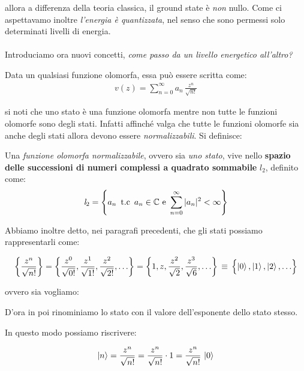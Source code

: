 	allora a differenza della teoria classica, il ground state è \textit{non} nullo. Come ci aspettavamo inoltre \textit{l'energia è quantizzata}, nel senso che sono permessi solo determinati livelli di energia.
	\\
	\\ 
	Introduciamo ora nuovi concetti, \textit{come passo da un livello energetico all'altro?}

\begin{mydef}
	Data un qualsiasi funzione olomorfa, essa può essere scritta come:
\begin{align*}
	v(z) = \sum_{n=0}^{\infty} a_n \, \frac{z^n}{\sqrt{n!}}
\end{align*}
\end{mydef}
	
	si noti che uno stato è una funzione olomorfa mentre non tutte le funzioni olomorfe sono degli stati. Infatti affinché valga che tutte le funzioni olomorfe sia anche degli stati allora devono essere \textit{normalizzabili}. Si definisce:
	
\begin{mydef}
	Una \textit{funzione olomorfa normalizzabile}, ovvero sia \textit{uno stato}, vive nello \textbf{spazio delle successioni di numeri complessi a quadrato sommabile} $\textit{l}_2$, definito come:
\begin{align*}
	\textit{l}_2 = \qty{a_n \,\,\, \text{t.c} \,\,\, a_n \in \mathbb{C}  \,\, \text{e} \,\, \sum_{n=0}^{\infty} |a_n|^2 < \infty}
\end{align*}
\end{mydef}

	Abbiamo inoltre detto, nei paragrafi precedenti, che gli stati possiamo rappresentarli come:
	
\begin{align*}
	\qty{\frac{z^n}{\sqrt{n!}}} = \qty{\frac{z^0}{\sqrt{0!}}, \frac{z^1}{\sqrt{1!}}, \frac{z^2}{\sqrt{2!}}, \ldots  } = \qty{1, z, \frac{z^2}{\sqrt{2}}, \frac{z^3}{\sqrt{6}}, \ldots} \, \equiv \,  \qty\Big{\ket{0}, \ket{1}, \ket{2}, \ldots}
\end{align*}

	ovvero sia vogliamo:
	
\begin{nb}
	D'ora in poi rinominiamo lo stato con il valore dell'esponente dello stato stesso.
\end{nb}

	In questo modo possiamo riscrivere:
	
\begin{align*}
	\ket{n} = \frac{z^n}{\sqrt{n!}} = \frac{z^n}{\sqrt{n!}}  \cdot 1 = \frac{z^n}{\sqrt{n!}}  \, \ket{0}  
\end{align*}

